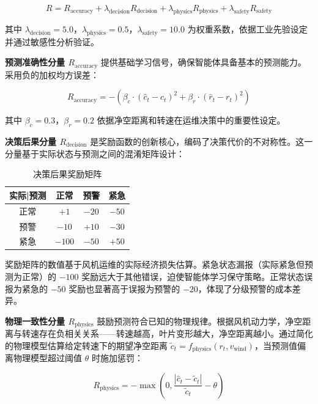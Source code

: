 \documentclass[12pt,a4paper]{article}
\begin{document}
\begin{equation}
R = R_{\text{accuracy}} + \lambda_{\text{decision}} R_{\text{decision}} + \lambda_{\text{physics}} R_{\text{physics}} + \lambda_{\text{safety}} R_{\text{safety}}
\end{equation}

其中 $\lambda_{\text{decision}} = 5.0$，$\lambda_{\text{physics}} = 0.5$，$\lambda_{\text{safety}} = 10.0$ 为权重系数，依据工业先验设定并通过敏感性分析验证。

\textbf{预测准确性分量 $R_{\text{accuracy}}$} 提供基础学习信号，确保智能体具备基本的预测能力。采用负的加权均方误差：

\begin{equation}
R_{\text{accuracy}} = -\left( \beta_c \cdot (\hat{c}_t - c_t)^2 + \beta_r \cdot (\hat{r}_t - r_t)^2 \right)
\end{equation}

其中 $\beta_c = 0.3$，$\beta_r = 0.2$ 依据净空距离和转速在运维决策中的重要性设定。

\textbf{决策后果分量 $R_{\text{decision}}$} 是奖励函数的创新核心，编码了决策代价的不对称性。这一分量基于实际状态与预测之间的混淆矩阵设计：

\begin{table}[h]
\centering
\caption{决策后果奖励矩阵}
\label{tab:reward_matrix}
\begin{tabular}{c|ccc}
\hline
实际|预测 & 正常 & 预警 & 紧急 \\
\hline
正常 & $+1$ & $-20$ & $-50$ \\
预警 & $-10$ & $+10$ & $-30$ \\
紧急 & $-100$ & $-50$ & $+50$ \\
\hline
\end{tabular}
\end{table}

奖励矩阵的数值基于风机运维的实际经济损失估算。紧急状态漏报（实际紧急但预测为正常）的 $-100$ 奖励远大于其他错误，迫使智能体学习保守策略。正常状态误报为紧急的 $-50$ 奖励也显著高于误报为预警的 $-20$，体现了分级预警的成本差异。

\textbf{物理一致性分量 $R_{\text{physics}}$} 鼓励预测符合已知的物理规律。根据风机动力学，净空距离与转速存在负相关关系——转速越高，叶片变形越大，净空距离越小。通过简化的物理模型估算给定转速下的期望净空距离 $\tilde{c}_t = f_{\text{physics}}(r_t, v_{\text{wind}})$，当预测值偏离物理模型超过阈值 $\theta$ 时施加惩罚：

\begin{equation}
R_{\text{physics}} = -\max\left(0, \frac{|\hat{c}_t - \tilde{c}_t|}{\tilde{c}_t} - \theta\right)
\end{equation}
\end{document}
